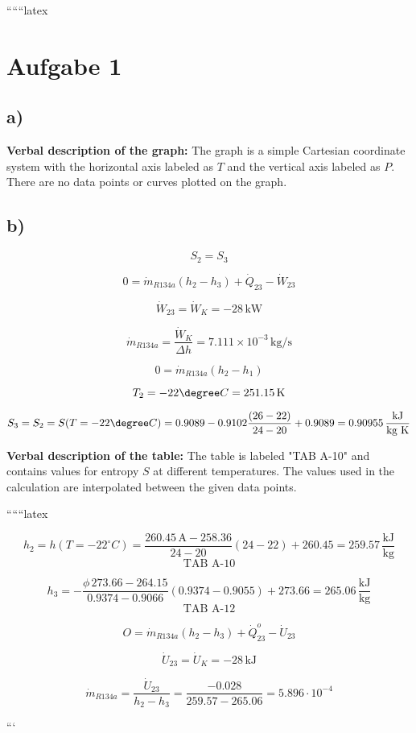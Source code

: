 
``````latex


\section*{Aufgabe 1}

\subsection*{a)}

\textbf{Verbal description of the graph:} The graph is a simple Cartesian coordinate system with the horizontal axis labeled as \( T \) and the vertical axis labeled as \( P \). There are no data points or curves plotted on the graph.

\subsection*{b)}

\[
S_2 = S_3
\]

\[
0 = \dot{m}_{R134a} (h_2 - h_3) + \dot{Q}_{23} - \dot{W}_{23}
\]

\[
\dot{W}_{23} = \dot{W}_K = -28 \, \text{kW}
\]

\[
\dot{m}_{R134a} = \frac{\dot{W}_K}{\Delta h} = 7.111 \times 10^{-3} \, \text{kg/s}
\]

\[
0 = \dot{m}_{R134a} (h_2 - h_1)
\]

\[
T_2 = -22 \degree C = 251.15 \, \text{K}
\]

\[
S_3 = S_2 = S(T = -22 \degree C) = 0.9089 - 0.9102 \frac{(26 - 22)}{24 - 20} + 0.9089 = 0.90955 \, \frac{\text{kJ}}{\text{kg K}}
\]

\textbf{Verbal description of the table:} The table is labeled "TAB A-10" and contains values for entropy \( S \) at different temperatures. The values used in the calculation are interpolated between the given data points.

``````latex


\[
h_2 = h\left(T = -22^\circ C\right) = \frac{260.45 \, \text{A} - 258.36}{24 - 20} (24 - 22) + 260.45 = 259.57 \, \frac{\text{kJ}}{\text{kg}}
\]
\[
\text{TAB A-10}
\]

\[
h_3 = -\frac{\phi \, 273.66 - 264.15}{0.9374 - 0.9066} (0.9374 - 0.9055) + 273.66 = 265.06 \, \frac{\text{kJ}}{\text{kg}}
\]
\[
\text{TAB A-12}
\]

\[
O = \dot{m}_{R134a} \left( h_2 - h_3 \right) + \dot{Q}_{23}^o - \dot{U}_{23}
\]

\[
\dot{U}_{23} = \dot{U}_K = -28 \, \text{kJ}
\]

\[
\dot{m}_{R134a} = \frac{\dot{U}_{23}}{h_2 - h_3} = \frac{-0.028}{259.57 - 265.06} = 5.896 \cdot 10^{-4}
\]

```